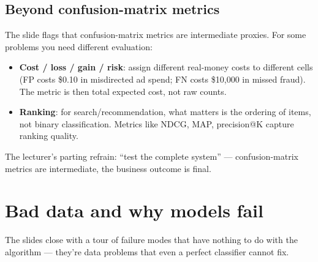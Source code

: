 \documentclass[11pt, a4paper]{article}
\begin{document}
\subsection{Beyond confusion-matrix metrics}

The slide flags that confusion-matrix metrics are intermediate proxies. For some problems you need different evaluation:
\begin{itemize}
  \item \textbf{Cost / loss / gain / risk}: assign different real-money costs to different cells (FP costs \$0.10 in misdirected ad spend; FN costs \$10,000 in missed fraud). The metric is then total expected cost, not raw counts.
  \item \textbf{Ranking}: for search/recommendation, what matters is the ordering of items, not binary classification. Metrics like NDCG, MAP, precision@K capture ranking quality.
\end{itemize}

The lecturer's parting refrain: ``test the complete system'' — confusion-matrix metrics are intermediate, the business outcome is final.

\section{Bad data and why models fail}

The slides close with a tour of failure modes that have nothing to do with the algorithm — they're data problems that even a perfect classifier cannot fix.
\end{document}
